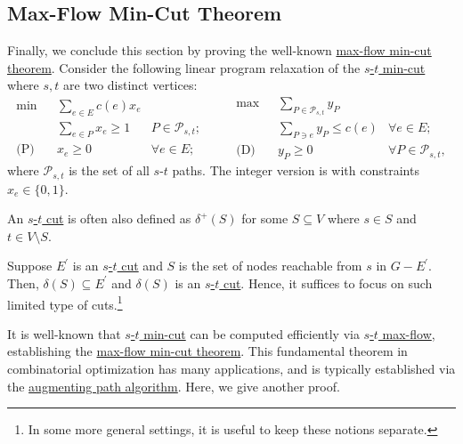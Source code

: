 \subsection{Max-Flow Min-Cut Theorem}
Finally, we conclude this section by proving the well-known \hyperref[thm:max-flow-min-cut]{max-flow min-cut theorem}. Consider the following linear program relaxation of the \hyperref[prb:s-t-min-cut]{\(s\)-\(t\) min-cut} where \(s, t\) are two distinct vertices:
\begin{equation}\label{eq:s-t-min-cut-LP}
	\begin{aligned}
		\min~           & \sum_{e \in E} c(e) x_e                                \\
		                & \sum_{e \in P} x_e \geq 1 & P \in \mathcal{P}_{s, t} ; \\
		\text{(P)}\quad & x_e \geq 0                & \forall e \in E;
	\end{aligned}\qquad
	\begin{aligned}
		\max~           & \sum_{P \in \mathcal{P}_{s, t}} y_P                                     \\
		                & \sum_{P \ni e} y_P \leq c(e)        & \forall e \in E ;                 \\
		\text{(D)}\quad & y_P \geq 0                          & \forall P \in \mathcal{P}_{s, t},
	\end{aligned}
\end{equation}
where \(\mathcal{P} _{s, t}\) is the set of all \(s\)-\(t\) paths. The integer version is with constraints \(x_e \in \{ 0, 1 \} \).

\begin{remark}
	An \hyperref[prb:s-t-min-cut]{\(s\)-\(t\) cut} is often also defined as \(\delta ^+(S)\) for some \(S \subseteq V\) where \(s \in S\) and \(t \in V \setminus S\).
\end{remark}
\begin{explanation}
	Suppose \(E^{\prime} \) is an \hyperref[prb:s-t-min-cut]{\(s\)-\(t\) cut} and \(S\) is the set of nodes reachable from \(s\) in \(G - E^{\prime} \). Then, \(\delta (S) \subseteq E^{\prime} \) and \(\delta (S)\) is an \hyperref[prb:s-t-min-cut]{\(s\)-\(t\) cut}. Hence, it suffices to focus on such limited type of cuts.\footnote{In some more general settings, it is useful to keep these notions separate.}
\end{explanation}

It is well-known that \hyperref[prb:s-t-min-cut]{\(s\)-\(t\) min-cut} can be computed efficiently via \hyperref[prb:s-t-max-flow]{\(s\)-\(t\) max-flow}, establishing the \hyperref[thm:max-flow-min-cut]{max-flow min-cut theorem}. This fundamental theorem in combinatorial optimization has many applications, and is typically established via the \hyperref[algo:augmenting-path]{augmenting path algorithm}. Here, we give another proof.

